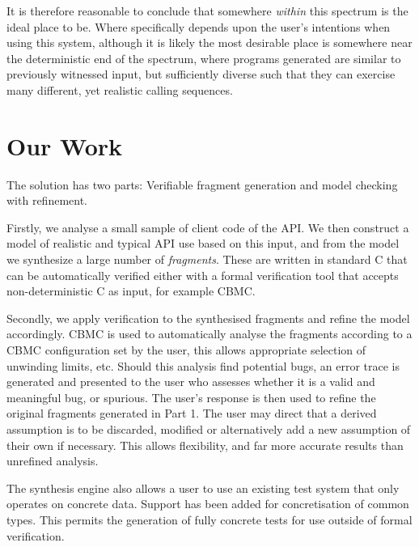\documentclass[EPiC]{easychair}
\begin{document}
It is therefore reasonable to conclude that somewhere \textit{within} this spectrum is the ideal place to be. Where specifically depends upon the user's intentions when using this system, although it is likely the most desirable place is somewhere near the deterministic end of the spectrum, where programs generated are similar to previously witnessed input, but sufficiently diverse such that they can exercise many different, yet realistic calling sequences.


  
  
\section{Our Work}
\label{sec:our_work}

The solution has two parts:   Verifiable fragment generation and model checking with refinement. 

Firstly, we analyse a small sample of client code of the API.  We then construct a model of realistic and typical API use based on this input, and from the model we synthesize a large number of \textit{fragments}.  These are written in standard C that can be automatically verified either with a formal verification tool that accepts non-deterministic C as input, for example CBMC. 

Secondly, we apply verification to the synthesised fragments and refine the model accordingly.  CBMC is used to automatically analyse the fragments according to a CBMC configuration set by the user, this allows appropriate selection of unwinding limits, etc.  Should this analysis find potential bugs, an error trace is generated and presented to the user who assesses whether it is a valid and meaningful bug, or spurious.  The user’s response is then used to refine the original fragments generated in Part 1.  The user may direct that a derived assumption is to be discarded, modified or alternatively add a new assumption of their own if necessary.  This allows flexibility, and far more accurate results than unrefined analysis.

The synthesis engine also allows a user to use an existing test system that only operates on concrete data.  Support has been added for concretisation of common types. This permits the generation of fully concrete tests for use outside of formal verification.
\end{document}
